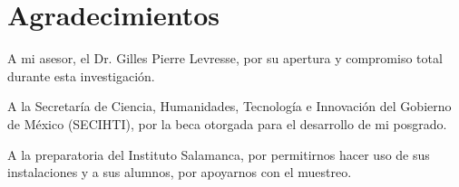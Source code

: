 \chapter*{Agradecimientos}

A mi asesor, el Dr. Gilles Pierre 
Levresse, por su apertura y compromiso 
total durante esta investigación. 

A la Secretaría de Ciencia, Humanidades, 
Tecnología e Innovación del Gobierno de México
(SECIHTI), por la beca otorgada para el 
desarrollo de mi posgrado. 

A la preparatoria del Instituto Salamanca, 
por permitirnos hacer uso de sus instalaciones 
y a sus alumnos, por apoyarnos con el muestreo. 

